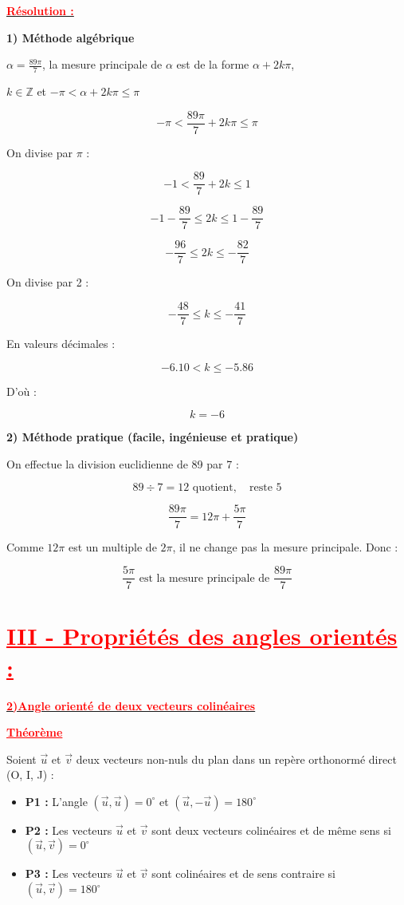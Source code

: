 \documentclass{article}
\begin{document}
\underline{\textbf{\textcolor{red}{Résolution :}}}

\textbf{1) Méthode algébrique}

$\alpha = \frac{89\pi}{7}$, la mesure principale de $\alpha$ est de la forme $\alpha + 2k\pi$,

$k \in \mathbb{Z}$ et $-\pi < \alpha + 2k\pi \leq \pi$

\[
-\pi < \frac{89\pi}{7} + 2k\pi \leq \pi
\]

On divise par $\pi$ :

\[
-1 < \frac{89}{7} + 2k \leq 1
\]

\[
-1 - \frac{89}{7} \leq 2k \leq 1 - \frac{89}{7}
\]

\[
-\frac{96}{7} \leq 2k \leq -\frac{82}{7}
\]

On divise par 2 :

\[
-\frac{48}{7} \leq k \leq -\frac{41}{7}
\]

En valeurs décimales :

\[
-6.10 < k \leq -5.86
\]

D'où :

\[
k = -6
\]

\textbf{2) Méthode pratique (facile, ingénieuse et pratique)}

On effectue la division euclidienne de 89 par 7 :

\[
89 \div 7 = 12 \text{ quotient}, \quad \text{reste } 5
\]

\[
\frac{89\pi}{7} = 12\pi +\frac{5\pi}{7}
\]

Comme $12\pi$ est un multiple de $2\pi$, il ne change pas la mesure principale. Donc :

\[
\frac{5\pi}{7} \text{ est la mesure principale de } \frac{89\pi}{7}
\]

\section*{\textcolor{red}{\textbf{\uline{III - Propriétés des angles orientés :}}}}

\underline{\textbf{\textcolor{red}{2)Angle orienté de deux vecteurs colinéaires}}}

\textcolor{red}{\textbf{\underline{Théorème}}}

Soient $\vec{u}$ et $\vec{v}$ deux vecteurs non-nuls du plan dans un repère orthonormé direct (O, I, J) :

\begin{itemize}
    \item \textbf{P1 :} L'angle $(\vec{u}, \vec{u}) = 0^\circ$ et $(\vec{u}, -\vec{u}) = 180^\circ$
    \item \textbf{P2 :} Les vecteurs $\vec{u}$ et $\vec{v}$ sont deux vecteurs colinéaires et de même sens si $(\vec{u}, \vec{v}) = 0^\circ$
    \item \textbf{P3 :} Les vecteurs $\vec{u}$ et $\vec{v}$ sont colinéaires et de sens contraire si $(\vec{u}, \vec{v}) = 180^\circ$
\end{itemize}
\end{document}
